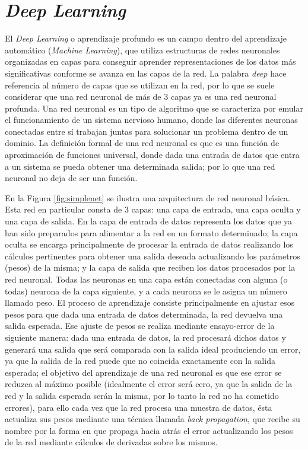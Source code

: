 \section{\textit{Deep Learning}}

El \textit{Deep Learning} o aprendizaje profundo es un campo dentro del aprendizaje automático (\textit{Machine Learning}), que utiliza estructuras de redes neuronales organizadas en capas para conseguir aprender representaciones de los datos más significativas conforme se avanza en las capas de la red. La palabra \textit{deep} hace referencia al número de capas que se utilizan en la red, por lo que se suele considerar que una red neuronal de más de 3 capas ya es una red neuronal profunda. Una red neuronal es un tipo de algoritmo que se caracteriza por emular el funcionamiento de un sistema nervioso humano, donde las diferentes neuronas conectadas entre sí trabajan juntas para solucionar un problema dentro de un dominio. La definición formal de una red neuronal es que es una función de aproximación de funciones universal, donde dada una entrada de datos que entra a un sistema se pueda obtener una determinada salida; por lo que una red neuronal no deja de ser una función.

En la Figura \ref{fig:simplenet} se ilustra una arquitectura de red neuronal básica. Esta red en particular consta de 3 capas: una capa de entrada, una capa oculta y una capa de salida. En la capa de entrada de datos representa los datos que ya han sido preparados para alimentar a la red en un formato determinado; la capa oculta se encarga principalmente de procesar la entrada de datos realizando los cálculos pertinentes para obtener una salida deseada actualizando los parámetros (pesos) de la misma; y la capa de salida que reciben los datos procesados por la red neuronal. Todas las neuronas en una capa están conectadas con alguna (o todas) neurona de la capa siguiente, y a cada neurona se le asigna un número llamado peso. El proceso de aprendizaje consiste principalmente en ajustar esos pesos para que dada una entrada de datos determinada, la red devuelva una salida esperada. Ese ajuste de pesos se realiza mediante ensayo-error de la siguiente manera: dada una entrada de datos, la red procesará dichos datos y generará una salida que será comparada con la salida ideal produciendo un error, ya que la salida de la red puede que no coincida exactamente con la salida esperada; el objetivo del aprendizaje de una red neuronal es que ese error se reduzca al máximo posible (idealmente el error será cero, ya que la salida de la red y la salida esperada serán la misma, por lo tanto la red no ha cometido errores), para ello cada vez que la red procesa una muestra de datos, ésta actualiza sus pesos mediante una técnica llamada \textit{back propagation}, que recibe su nombre por la forma en que propaga hacia atrás el error actualizando los pesos de la red mediante cálculos de derivadas sobre los mismos.


